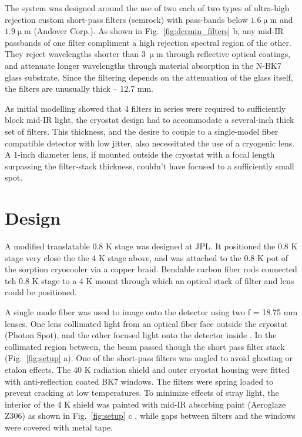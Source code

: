 \documentclass[11pt]{caltech_thesis} %
\begin{document}
The system was designed around the use of two each of two types of ultra-high rejection custom short-pass filters (semrock) with pass-bands below $1.6 \mathrm{\upmu m}$ and $1.9 \mathrm{\upmu m}$ (Andover Corp.). As shown in Fig.~\ref{fig:dcrmin_filters} b, any mid-IR passbands of one filter compliment a high rejection spectral region of the other. They reject wavelengths shorter than $3 \ \mathrm{\upmu m}$ through reflective optical coatings, and attenuate longer wavelengths through material absorption in the N-BK7 glass substrate. Since the filtering depends on the attenuation of the glass itself, the filters are unusually thick -- 12.7 mm.

As initial modelling showed that 4 filters in series were required to sufficiently block mid-IR light, the cryostat design had to accommodate a several-inch thick set of filters. This thickness, and the desire to couple to a single-model fiber compatible detector with low jitter, also necessitated the use of a cryogenic lens. A 1-inch diameter lens, if mounted outside the cryostat with a focal length surpassing the filter-stack thickness, couldn't have focused to a sufficiently small spot.

\hypertarget{design}{%
\section{Design}\label{design}}

A modified translatable 0.8 K stage was designed at JPL. It positioned the 0.8 K stage very close the the 4 K stage above, and was attached to the 0.8 K pot of the sorption cryocooler via a copper braid. Bendable carbon fiber rods connected teh 0.8 K stage to a 4 K mount through which an optical stack of filter and lens could be positioned.

A single mode fiber was used to image onto the detector using two f = 18.75 mm lenses. One lens collimated light from an optical fiber face outside the cryostat (Photon Spot), and the other focused light onto the detector inside \autocite{Bellei:16}. In the collimated region between, the beam passed though the short pass filter stack (Fig.~\ref{fig:setup} a). One of the short-pass filters was angled to avoid ghosting or etalon effects. The 40 K radiation shield and outer cryostat housing were fitted with anti-reflection coated BK7 windows. The filters were spring loaded to prevent cracking at low temperatures. To minimize effects of stray light, the interior of the 4 K shield was painted with mid-IR absorbing paint (Aeroglaze Z306) as shown in Fig.~\ref{fig:setup} c \autocite{Persky1999}, while gaps between filters and the windows were covered with metal tape.
\end{document}
